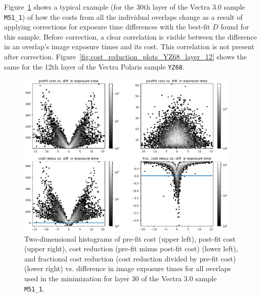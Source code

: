 \documentclass[letterpaper,11pt]{article}
\newcommand{\reffig}[1]{Figure~\ref{#1}}
\begin{document}
\reffig{fig:cost_reduction_plots_M51_1_layer_30} shows a typical example (for the 30th layer of the Vectra 3.0 sample \texttt{M51\_1}) of how the costs from all the individual overlaps change as a result of applying corrections for exposure time differences with the best-fit $D$ found for this sample. Before correction, a clear correlation is visible between the difference in an overlap's image exposure times and its cost. This correlation is not present after correction. \reffig{fig:cost_reduction_plots_YZ68_layer_12} shows the same for the 12th layer of the Vectra Polaris sample \texttt{YZ68}.

\begin{figure}[!ht]
\centering
\includegraphics[width=0.95\textwidth]{images/methods/cost_reduction_plots_2d_M51_1_layer_30}
\caption{\footnotesize Two-dimensional histograms of pre-fit cost (upper left), post-fit cost (upper right), cost reduction (pre-fit minus post-fit cost) (lower left), and fractional cost reduction (cost reduction divided by pre-fit cost) (lower right) vs. difference in image exposure times for all overlaps used in the minimization for layer 30 of the Vectra 3.0 sample \texttt{M51\_1}.}
\label{fig:cost_reduction_plots_M51_1_layer_30}
\end{figure}
\end{document}
